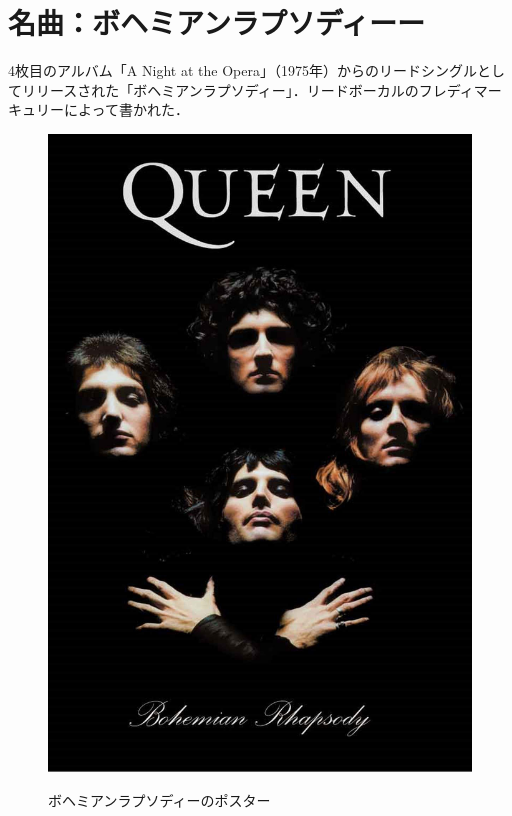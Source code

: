 \documentclass[a4j, twocolumn]{jarticle}
\begin{document}
\section{名曲：ボヘミアンラプソディーー}
4枚目のアルバム「A Night at the Opera」（1975年）からのリードシングルとしてリリースされた「ボヘミアンラプソディー」．リードボーカルのフレディマーキュリーによって書かれた．

\begin{figure}[htb]
  \begin{center}
      \includegraphics[scale=0.1]{Bohemian.jpg}
      \caption{ボヘミアンラプソディーのポスター}
      \vspace{-15pt}
      \label{Bohemian}
  \end{center}
\end{figure}
\end{document}
